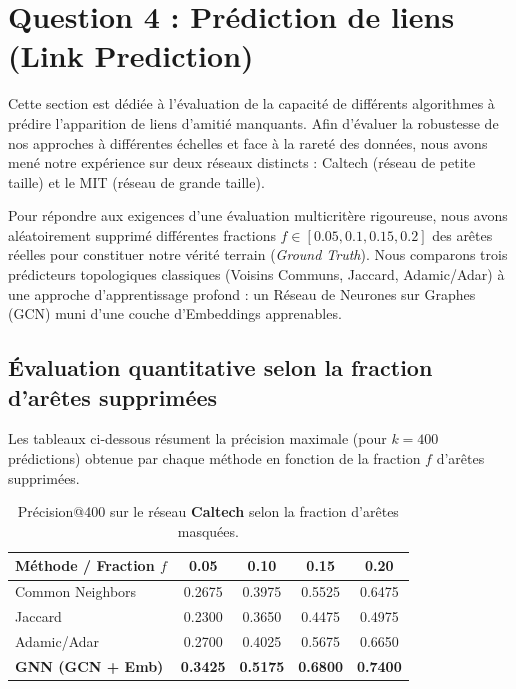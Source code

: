 \documentclass[a4paper,11pt]{article}
\begin{document}
\section{Question 4 : Prédiction de liens (Link Prediction)}

Cette section est dédiée à l'évaluation de la capacité de différents algorithmes à prédire l'apparition de liens d'amitié manquants. Afin d'évaluer la robustesse de nos approches à différentes échelles et face à la rareté des données, nous avons mené notre expérience sur deux réseaux distincts : Caltech (réseau de petite taille) et le MIT (réseau de grande taille). 

Pour répondre aux exigences d'une évaluation multicritère rigoureuse, nous avons aléatoirement supprimé différentes fractions $f \in [0.05, 0.1, 0.15, 0.2]$ des arêtes réelles pour constituer notre vérité terrain (\textit{Ground Truth}). Nous comparons trois prédicteurs topologiques classiques (Voisins Communs, Jaccard, Adamic/Adar) à une approche d'apprentissage profond : un Réseau de Neurones sur Graphes (GCN) muni d'une couche d'Embeddings apprenables.

\subsection{Évaluation quantitative selon la fraction d'arêtes supprimées}

Les tableaux ci-dessous résument la précision maximale (pour $k=400$ prédictions) obtenue par chaque méthode en fonction de la fraction $f$ d'arêtes supprimées.

\begin{table}[H]
    \centering
    \begin{tabular}{|l|c|c|c|c|}
        \hline
        \textbf{Méthode / Fraction $f$} & \textbf{0.05} & \textbf{0.10} & \textbf{0.15} & \textbf{0.20} \\
        \hline
        Common Neighbors & 0.2675 & 0.3975 & 0.5525 & 0.6475 \\
        Jaccard & 0.2300 & 0.3650 & 0.4475 & 0.4975 \\
        Adamic/Adar & 0.2700 & 0.4025 & 0.5675 & 0.6650 \\
        \textbf{GNN (GCN + Emb)} & \textbf{0.3425} & \textbf{0.5175} & \textbf{0.6800} & \textbf{0.7400} \\
        \hline
    \end{tabular}
    \caption{Précision@400 sur le réseau \textbf{Caltech} selon la fraction d'arêtes masquées.}
    \label{tab:q4_caltech}
\end{table}
\end{document}
